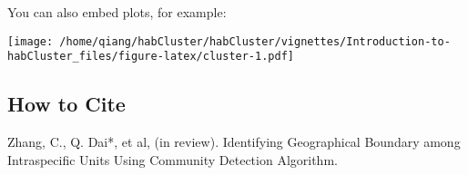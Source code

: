 \documentclass[
]{article}
\newenvironment{Shaded}{\begin{snugshade}}{\end{snugshade}}
\newcommand{\AttributeTok}[1]{\textcolor[rgb]{0.77,0.63,0.00}{#1}}
\newcommand{\DecValTok}[1]{\textcolor[rgb]{0.00,0.00,0.81}{#1}}
\newcommand{\FunctionTok}[1]{\textcolor[rgb]{0.00,0.00,0.00}{#1}}
\newcommand{\NormalTok}[1]{#1}
\newcommand{\SpecialCharTok}[1]{\textcolor[rgb]{0.00,0.00,0.00}{#1}}
\newcommand{\StringTok}[1]{\textcolor[rgb]{0.31,0.60,0.02}{#1}}
\begin{document}
You can also embed plots, for example:

\begin{Shaded}
\end{Shaded}

\texttt{[image: /home/qiang/habCluster/habCluster/vignettes/Introduction-to-habCluster\_files/figure-latex/cluster-1.pdf]}

\hypertarget{how-to-cite}{%
\subsection{How to Cite}\label{how-to-cite}}

Zhang, C., Q. Dai*, et al, (in review). Identifying Geographical
Boundary among Intraspecific Units Using Community Detection Algorithm.
\end{document}

